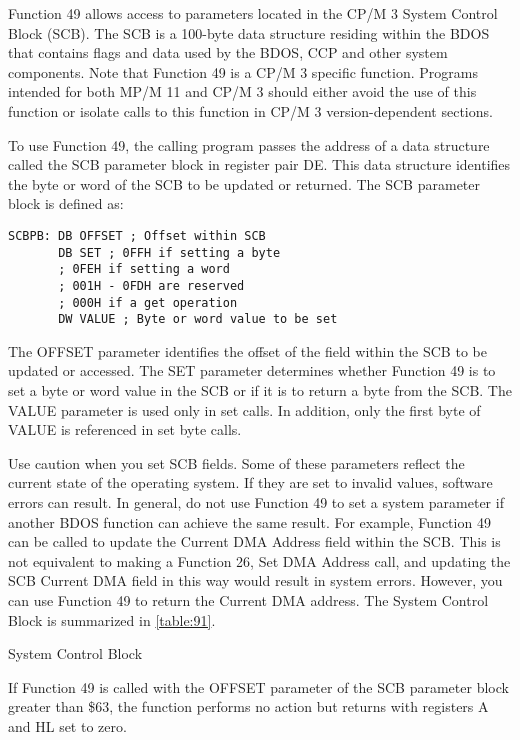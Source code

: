 Function 49 allows access to parameters located in the CP/M 3 System
Control Block (SCB). The SCB is a 100-byte data structure residing
within the BDOS that contains flags and data used by the BDOS, CCP and
other system components. Note that Function 49 is a CP/M 3 specific
function. Programs intended for both MP/M 11 and CP/M 3 should either
avoid the use of this function or isolate calls to this function in
CP/M 3 version-dependent sections.

To use Function 49, the calling program passes the address of a data
structure called the SCB parameter block in register pair DE. This
data structure identifies the byte or word of the SCB to be updated or
returned. The SCB parameter block is defined as:

\begin{verbatim}
SCBPB: DB OFFSET ; Offset within SCB
       DB SET ; 0FFH if setting a byte
       ; 0FEH if setting a word
       ; 001H - 0FDH are reserved
       ; 000H if a get operation
       DW VALUE ; Byte or word value to be set
\end{verbatim}

The OFFSET parameter identifies the offset of the field within the SCB
to be updated or accessed. The SET parameter determines whether
Function 49 is to set a byte or word value in the SCB or if it is to
return a byte from the SCB. The VALUE parameter is used only in set
calls. In addition, only the first byte of VALUE is referenced in set
byte calls.

Use caution when you set SCB fields. Some of these parameters reflect
the current state of the operating system. If they are set to invalid
values, software errors can result. In general, do not use Function 49
to set a system parameter if another BDOS function can achieve the
same result. For example, Function 49 can be called to update the
Current DMA Address field within the SCB. This is not equivalent to
making a Function 26, Set DMA Address call, and updating the SCB
Current DMA field in this way would result in system errors. However,
you can use Function 49 to return the Current DMA address. The System
Control Block is summarized in \ref{table:91}.

\begin{table}[ht]\centering
  \caption{System Control Block}
\label{table:91}
\end{table}

If Function 49 is called with the OFFSET parameter of the SCB
parameter block greater than \$63, the function performs no action but
returns with registers A and HL set to zero.

